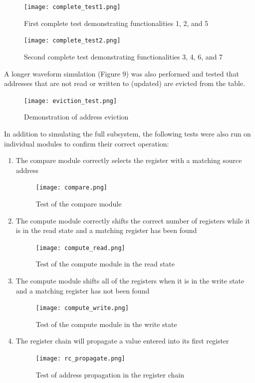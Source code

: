 \documentclass{article}
\begin{document}
\begin{figure}[ht!]
  \centering
  	\texttt{[image: complete\_test1.png]}
  \caption{First complete test demonstrating functionalities 1, 2, and 5}
  \label{fig:complete-test1}
\end{figure}

\begin{figure}[ht!]
  \centering
  	\texttt{[image: complete\_test2.png]}
  \caption{Second complete test demonstrating functionalities 3, 4, 6, and 7}
  \label{fig:complete-test2}
\end{figure}

\newpage

A longer waveform simulation (Figure 9) was also performed and tested that addresses that are not read or written to (updated) are evicted from the table.

\begin{figure}[ht!]
  \centering
  	\texttt{[image: eviction\_test.png]}
  \caption{Demonstration of address eviction}
  \label{fig:eviction-test}
\end{figure}

In addition to simulating the full subsystem, the following tests were also run on individual modules to confirm their correct operation:
\begin{enumerate}
\item The compare module correctly selects the register with a matching source address

\begin{figure}[ht!]
  \centering
  	\texttt{[image: compare.png]}
  \caption{Test of the compare module}
  \label{fig:eviction}
\end{figure}

\item The compute module correctly shifts the correct number of registers while it is in the read state and a matching register has been found

\begin{figure}[ht!]
  \centering
  	\texttt{[image: compute\_read.png]}
  \caption{Test of the compute module in the read state}
  \label{fig:compute_read}
\end{figure}

\newpage

\item The compute module shifts all of the registers when it is in the write state and a matching register has not been found

\begin{figure}[ht!]
  \centering
  	\texttt{[image: compute\_write.png]}
  \caption{Test of the compute module in the write state}
  \label{fig:compute_write}
\end{figure}

\item The register chain will propagate a value entered into its first register

\begin{figure}[ht!]
  \centering
  	\texttt{[image: rc\_propagate.png]}
  \caption{Test of address propagation in the register chain}
  \label{fig:rc_propagate}
\end{figure}

\end{enumerate}
\end{document}
